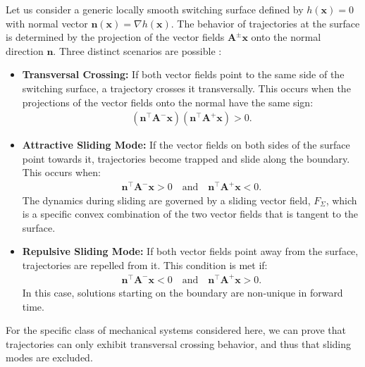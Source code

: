 \documentclass[a4paper,9pt,parskip=half,english]{article}
\theoremstyle{plain}
\theoremstyle{definition}
\newcommand{\T}{^{\!\top}} %
\newcommand{\vn}{\mathbf n}
\newcommand{\vx}{\mathbf x}
\newcommand{\vA}{\mathbf A}
\begin{document}
Let us consider a generic locally smooth switching surface defined by $h(\vx)=0$ with normal vector $\vn(\vx) = \nabla h(\vx)$. The behavior of trajectories at the surface is determined by the projection of the vector fields $\vA^{\pm}\vx$ onto the normal direction $\vn$. Three distinct scenarios are possible \cite{Lein2004}:
\begin{itemize}
	\item \textbf{Transversal Crossing:} If both vector fields point to the same side of the switching surface, a trajectory crosses it transversally. This occurs when the projections of the vector fields onto the normal have the same sign:
	\begin{align}
		(\vn\T \vA^-\vx)(\vn\T \vA^+\vx) > 0.
	\end{align}
	\item \textbf{Attractive Sliding Mode:} If the vector fields on both sides of the surface point towards it, trajectories become trapped and slide along the boundary. This occurs when:
	\begin{align}
		\vn\T \vA^-\vx > 0 \quad \text{and} \quad \vn\T \vA^+\vx < 0.
	\end{align}
	The dynamics during sliding are governed by a sliding vector field, $F_{\Sigma}$, which is a specific convex combination of the two vector fields that is tangent to the surface.
	\item \textbf{Repulsive Sliding Mode:} If both vector fields point away from the surface, trajectories are repelled from it. This condition is met if:
	\begin{align}
		\vn\T \vA^-\vx < 0 \quad \text{and} \quad \vn\T \vA^+\vx > 0.
	\end{align}
	In this case, solutions starting on the boundary are non-unique in forward time.
\end{itemize}
For the specific class of mechanical systems considered here, we can prove that trajectories can only exhibit transversal crossing behavior, and thus that sliding modes are excluded.
\end{document}

